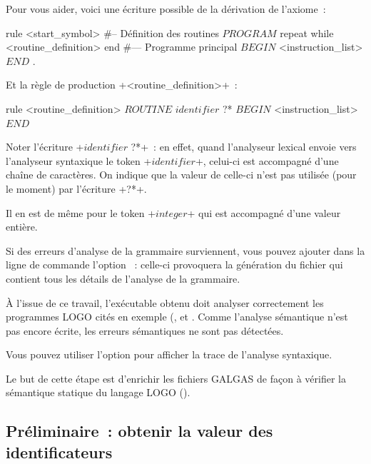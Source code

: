 Pour vous aider, voici une écriture possible de la dérivation de l'axiome~:

\begin{galgas3}
rule <start_symbol> {
#-- Définition des routines
  $PROGRAM$
  repeat
  while
    <routine_definition>
  end
#--- Programme principal
  $BEGIN$
  <instruction_list>
  $END$
  $.$
}
\end{galgas3}

Et la règle de production \ggst+<routine_definition>+~:

\begin{galgas3}
rule <routine_definition> {
  $ROUTINE$
  $identifier$ ?*
  $BEGIN$
  <instruction_list>
  $END$
}
\end{galgas3}

Noter l’écriture \ggst+$identifier$ ?*+~: en effet, quand l’analyseur lexical envoie vers l’analyseur syntaxique le token \ggst+$identifier$+, celui-ci est accompagné d’une chaîne de caractères. On indique que la valeur de celle-ci n’est pas utilisée (pour le moment) par l’écriture \ggst+?*+.

Il en est de même pour le token \ggst+$integer$+ qui est accompagné d’une valeur entière.

Si des erreurs d'analyse de la grammaire surviennent, vous pouvez ajouter dans la ligne de commande l'option ~: celle-ci provoquera la génération du fichier \- qui contient tous les détails de l'analyse de la grammaire.

À l'issue de ce travail, l'exécutable obtenu doit analyser correctement les programmes LOGO cités en exemple (,   et . Comme l'analyse sémantique n'est pas encore écrite, les erreurs sémantiques ne sont pas détectées.

Vous pouvez utiliser l'option  pour afficher la trace de l'analyse syntaxique.








Le but de cette étape est d'enrichir les fichiers GALGAS de façon à vérifier la sémantique statique du langage LOGO ().

\subsection{Préliminaire~: obtenir la valeur des identificateurs}

